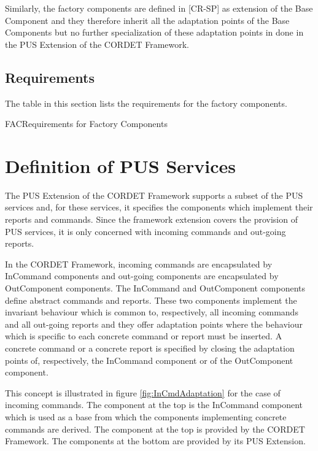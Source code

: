 \documentclass{pnp_article}
\begin{document}
Similarly, the factory components are defined in [CR-SP] as extension of the Base Component and they therefore inherit all the adaptation points of the Base Components but no further specialization of these adaptation points in done in the PUS Extension of the CORDET Framework.

\subsection{Requirements}
The table in this section lists the requirements for the factory components.

\begin{crReq}{FAC}{Requirements for Factory Components}
\end{crReq}


\section{Definition of PUS Services}\label{sec:defPusRepCmd}
The PUS Extension of the CORDET Framework supports a subset of the PUS services and, for these services, it specifies the components which implement their reports and commands. Since the framework extension covers the provision of PUS services, it is only concerned with incoming commands and out-going reports. 

In the CORDET Framework, incoming commands are encapsulated by InCommand components and out-going components are encapsulated by OutComponent components. The InCommand and OutComponent components define abstract commands and reports. These two components implement the invariant behaviour which is common to, respectively, all incoming commands and all out-going reports and they offer adaptation points where the behaviour which is specific to each concrete command or report must be inserted. A concrete command or a concrete report is specified by closing the adaptation points of, respectively, the InCommand component or of the OutComponent component. 

This concept is illustrated in figure \ref{fig:InCmdAdaptation} for the case of incoming commands. The component at the top is the InCommand component which is used as a base from which the components implementing concrete commands are derived. The component at the top is provided by the CORDET Framework. The components at the bottom are provided by its PUS Extension. 
\end{document}
